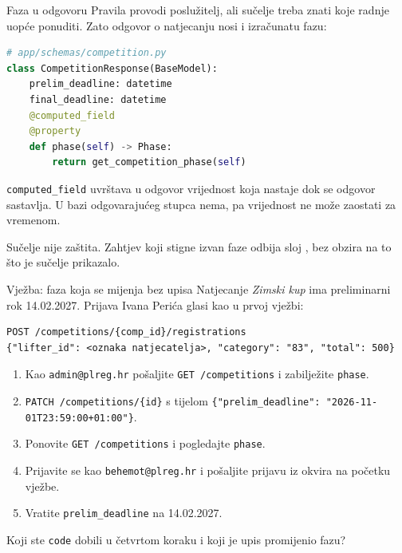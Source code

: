 \begin{frame}[fragile]{Faza u odgovoru}
Pravila provodi poslužitelj, ali sučelje treba znati koje radnje uopće ponuditi. Zato odgovor o natjecanju nosi i izračunatu fazu:

\begin{lstlisting}[language=python]
# app/schemas/competition.py
class CompetitionResponse(BaseModel):
    prelim_deadline: datetime
    final_deadline: datetime
    @computed_field
    @property
    def phase(self) -> Phase:
        return get_competition_phase(self)
\end{lstlisting}

\vspace{0.15em}
\texttt{computed\_field} uvrštava u odgovor vrijednost koja nastaje dok se odgovor sastavlja. U bazi odgovarajućeg stupca nema, pa vrijednost ne može zaostati za vremenom.

\vspace{0.15em}
Sučelje nije zaštita. Zahtjev koji stigne izvan faze odbija sloj , bez obzira na to što je sučelje prikazalo.
\end{frame}

\begin{frame}[fragile]{Vježba: faza koja se mijenja bez upisa}
Natjecanje \emph{Zimski kup} ima preliminarni rok 14.02.2027. Prijava Ivana Perića glasi kao u prvoj vježbi:

\begin{lstlisting}
POST /competitions/{comp_id}/registrations
{"lifter_id": <oznaka natjecatelja>, "category": "83", "total": 500}
\end{lstlisting}

\vspace{0.3em}
\begin{enumerate}
  \itemsep0.35em
  \item Kao \texttt{admin@plreg.hr} pošaljite \texttt{GET /competitions} i zabilježite \texttt{phase}.
  \item \texttt{PATCH /competitions/\{id\}} s tijelom \texttt{\{"prelim\_deadline": "2026-11-01T23:59:00+01:00"\}}.
  \item Ponovite \texttt{GET /competitions} i pogledajte \texttt{phase}.
  \item Prijavite se kao \texttt{behemot@plreg.hr} i pošaljite prijavu iz okvira na početku vježbe.
  \item Vratite \texttt{prelim\_deadline} na 14.02.2027.
\end{enumerate}

\vspace{0.4em}
Koji ste \texttt{code} dobili u četvrtom koraku i koji je upis promijenio fazu?
\end{frame}

